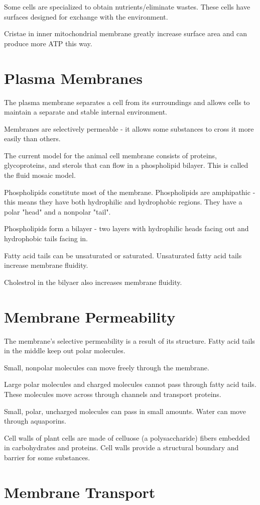 \documentclass[../bio.tex]{subfiles}
\begin{document}
Some cells are specialized to obtain nutrients/eliminate wastes. These cells have surfaces designed for exchange with the environment. 

Cristae in inner mitochondrial membrane greatly increase surface area and can produce more ATP this way.  
\section{Plasma Membranes}
The plasma membrane separates a cell from its surroundings and allows cells to maintain a separate and stable internal environment.

Membranes are selectively permeable - it allows some substances to cross it more easily than others.

The current model for the animal cell membrane consists of proteins, glycoproteins, and sterols that can flow in a phospholipid bilayer. This is called the fluid mosaic model.

Phospholipids constitute most of the membrane. Phospholipids are amphipathic - this means they have both hydrophilic and hydrophobic regions. They have a polar "head" and a nonpolar "tail".

Phospholipids form a bilayer - two layers with hydrophilic heads facing out and hydrophobic tails facing in.

Fatty acid tails can be unsaturated or saturated. Unsaturated fatty acid tails increase membrane fluidity. 

Cholestrol in the bilyaer also increases membrane fluidity.
\section{Membrane Permeability}
The membrane's selective permeability is a result of its structure. Fatty acid tails in the middle keep out polar molecules.

Small, nonpolar molecules can move freely through the membrane. 

Large polar molecules and charged molecules cannot pass through fatty acid tails. These molecules move across through channels and transport proteins.

Small, polar, uncharged molecules can pass in small amounts. Water can move through aquaporins. 

Cell walls of plant cells are made of celluose (a polysaccharide) fibers embedded in carbohydrates and proteins. Cell walls provide a structural boundary and barrier for some substances.
\section{Membrane Transport}
\end{document}
